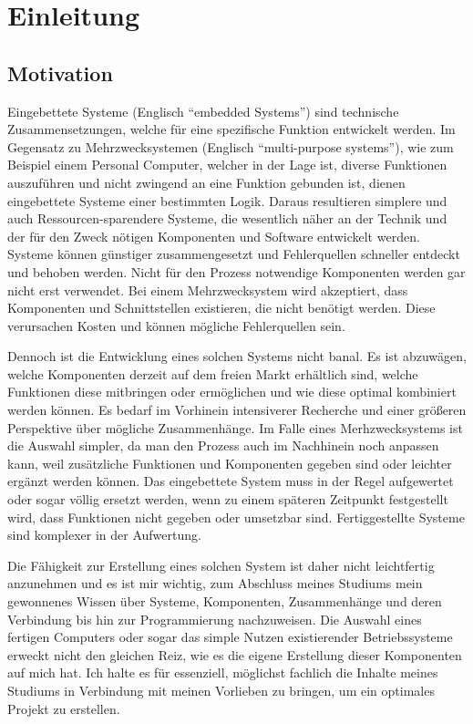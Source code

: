 \hypertarget{einleitung}{%
\chapter{Einleitung}\label{einleitung}}

\hypertarget{motivation}{%
\section{Motivation}\label{motivation}}

Eingebettete Systeme (Englisch ``embedded Systems'') sind technische
Zusammensetzungen, welche für eine spezifische Funktion entwickelt
werden. Im Gegensatz zu Mehrzwecksystemen (Englisch ``multi-purpose
systems''), wie zum Beispiel einem Personal Computer, welcher in der
Lage ist, diverse Funktionen auszuführen und nicht zwingend an eine
Funktion gebunden ist, dienen eingebettete Systeme einer bestimmten
Logik. Daraus resultieren simplere und auch Ressourcen-sparendere
Systeme, die wesentlich näher an der Technik und der für den Zweck
nötigen Komponenten und Software entwickelt werden. Systeme können
günstiger zusammengesetzt und Fehlerquellen schneller entdeckt und
behoben werden. Nicht für den Prozess notwendige Komponenten werden gar
nicht erst verwendet. Bei einem Mehrzwecksystem wird akzeptiert, dass
Komponenten und Schnittstellen existieren, die nicht benötigt werden.
Diese verursachen Kosten und können mögliche Fehlerquellen sein.

Dennoch ist die Entwicklung eines solchen Systems nicht banal. Es ist
abzuwägen, welche Komponenten derzeit auf dem freien Markt erhältlich
sind, welche Funktionen diese mitbringen oder ermöglichen und wie diese
optimal kombiniert werden können. Es bedarf im Vorhinein intensiverer
Recherche und einer größeren Perspektive über mögliche Zusammenhänge. Im
Falle eines Merhzwecksystems ist die Auswahl simpler, da man den Prozess
auch im Nachhinein noch anpassen kann, weil zusätzliche Funktionen und
Komponenten gegeben sind oder leichter ergänzt werden können. Das
eingebettete System muss in der Regel aufgewertet oder sogar völlig
ersetzt werden, wenn zu einem späteren Zeitpunkt festgestellt wird, dass
Funktionen nicht gegeben oder umsetzbar sind. Fertiggestellte Systeme
sind komplexer in der Aufwertung.

Die Fähigkeit zur Erstellung eines solchen System ist daher nicht
leichtfertig anzunehmen und es ist mir wichtig, zum Abschluss meines
Studiums mein gewonnenes Wissen über Systeme, Komponenten, Zusammenhänge
und deren Verbindung bis hin zur Programmierung nachzuweisen. Die
Auswahl eines fertigen Computers oder sogar das simple Nutzen
existierender Betriebssysteme erweckt nicht den gleichen Reiz, wie es
die eigene Erstellung dieser Komponenten auf mich hat. Ich halte es für
essenziell, möglichst fachlich die Inhalte meines Studiums in Verbindung
mit meinen Vorlieben zu bringen, um ein optimales Projekt zu erstellen.

